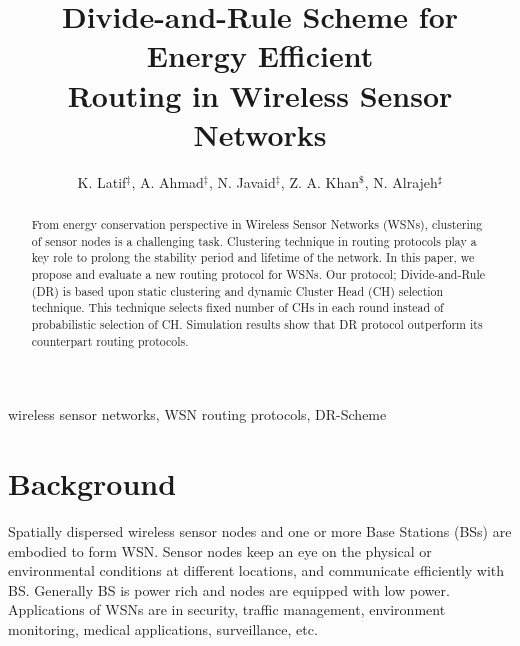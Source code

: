 \documentclass[3p,times,procedia]{elsarticle}
\begin{document}
\begin{frontmatter}

\title{Divide-and-Rule Scheme for Energy Efficient\\ Routing in Wireless Sensor Networks}

\author{K. Latif$^{\ddag}$, A. Ahmad$^{\ddag}$, N. Javaid$^{\ddag}$, Z. A. Khan$^{\$}$, N. Alrajeh$^{\sharp}$}

\address{$^{\ddag}$COMSATS Institute of Information Technology, Islamabad, Pakistan. \\
        $^{\$}$Faculty of Engineering, Dalhousie University, Halifax, Canada.\\
        $^{\sharp}$B.M.T., C.A.M.S, King Saud University, Riyadh, Saudi Arabia.\\
}

\begin{abstract}
From energy conservation perspective in Wireless Sensor Networks (WSNs), clustering of sensor nodes is a challenging task. Clustering technique in routing protocols play a key role to prolong the stability period and lifetime of the network. In this paper, we propose and evaluate a new routing protocol for WSNs. Our protocol; Divide-and-Rule (DR) is based upon static clustering and dynamic Cluster Head (CH) selection technique. This technique selects fixed number of CHs in each round instead of probabilistic selection of CH. Simulation results show that DR protocol outperform its counterpart routing protocols.
\end{abstract}

\begin{keyword}
wireless sensor networks, WSN routing protocols, DR-Scheme
\end{keyword}

\end{frontmatter}

\section{Background}
Spatially dispersed wireless sensor nodes and one or more Base Stations (BSs) are embodied to form WSN. Sensor nodes keep an eye on the physical or environmental conditions at different locations, and communicate efficiently with BS. Generally BS is power rich and nodes are equipped with low power. Applications of WSNs are in security, traffic management, environment monitoring, medical applications, surveillance, etc.
\end{document}

